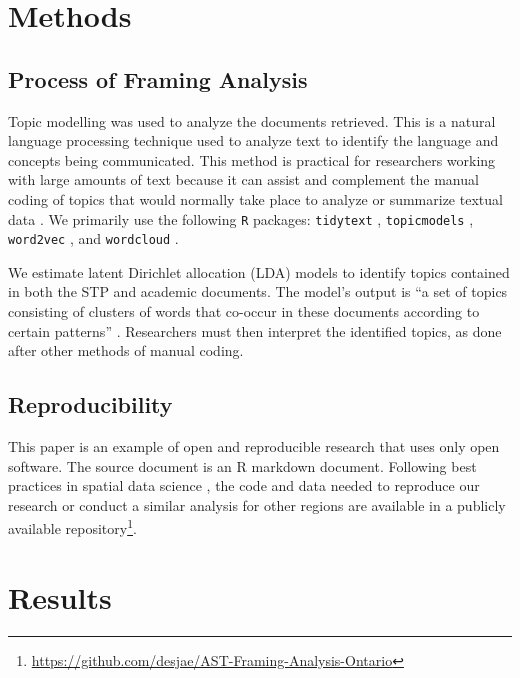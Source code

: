 \documentclass[preprint, 3p,
authoryear]{elsarticle} %
\begin{document}
\hypertarget{methods}{%
\section{Methods}\label{methods}}

\hypertarget{process-of-framing-analysis}{%
\subsection{Process of Framing
Analysis}\label{process-of-framing-analysis}}

Topic modelling was used to analyze the documents retrieved. This is a
natural language processing technique used to analyze text to identify
the language and concepts being communicated. This method is practical
for researchers working with large amounts of text because it can assist
and complement the manual coding of topics that would normally take
place to analyze or summarize textual data
\citep{jacobiQuantitativeAnalysisLarge2016}. We primarily use the
following \texttt{R} packages: \texttt{tidytext}
\citep{silge2016tidytext}, \texttt{topicmodels} \citep{grun2011topic},
\texttt{word2vec} \citep{wijffels2021word2vec}, and \texttt{wordcloud}
\citep{fellows2018wordloud}.

We estimate latent Dirichlet allocation (LDA) models to identify topics
contained in both the STP and academic documents. The model's output is
``a set of topics consisting of clusters of words that co-occur in these
documents according to certain patterns''
\citep{jacobiQuantitativeAnalysisLarge2016}. Researchers must then
interpret the identified topics, as done after other methods of manual
coding.

\hypertarget{reproducibility}{%
\subsection{Reproducibility}\label{reproducibility}}

This paper is an example of open and reproducible research that uses
only open software. The source document is an R markdown document.
Following best practices in spatial data science
\citep{brunsdon2020opening}, the code and data needed to reproduce our
research or conduct a similar analysis for other regions are available
in a publicly available repository\footnote{\url{https://github.com/desjae/AST-Framing-Analysis-Ontario}}.

\hypertarget{results}{%
\section{Results}\label{results}}
\end{document}
